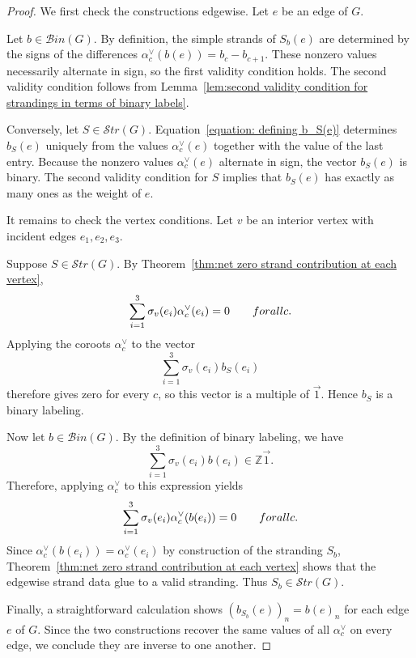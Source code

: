\documentclass[10pt,a4paper]{amsart}
\begin{document}
\begin{proof}
We first check the constructions edgewise. Let $e$ be an edge of $G$.

Let $b\in\mathcal{B}in(G)$. By definition, the simple strands of $S_b(e)$ are determined by the signs of the differences $\alpha_c^\vee(b(e))=b_c-b_{c+1}$. These nonzero values necessarily alternate in sign, so the first validity condition holds. The second validity condition follows from Lemma~\ref{lem:second validity condition for strandings in terms of binary labels}.

Conversely, let $S\in\mathcal{S}tr(G)$. Equation~\eqref{equation: defining b_S(e)} determines $b_S(e)$ uniquely from the values $\alpha_c^\vee(e)$ together with the value of the last entry. Because the nonzero values $\alpha_c^\vee(e)$ alternate in sign, the vector $b_S(e)$ is binary. The second validity condition for $S$ implies that $b_S(e)$ has exactly as many ones as the weight of $e$.


It remains to check the vertex conditions. Let $v$ be an interior vertex with incident edges $e_1,e_2,e_3$. 

Suppose $S\in\mathcal{S}tr(G)$. By Theorem~\ref{thm:net zero strand contribution at each vertex},
$$
\sum_{i=1}^3 \sigma_v(e_i)\alpha_c^\vee(e_i)=0
\qquad\textup{for all } c.
$$
Applying the coroots $\alpha_c^\vee$ to the vector
$$
\sum_{i=1}^3 \sigma_v(e_i)b_S(e_i)
$$
therefore gives zero for every $c$, so this vector is a multiple of $\vec{1}$. Hence $b_S$ is a binary labeling.

Now let $b\in\mathcal{B}in(G)$.  By the definition of binary labeling, we have
$$
\sum_{i=1}^3 \sigma_v(e_i)b(e_i)\in \mathbb{Z}\vec{1}.
$$
 Therefore, applying $\alpha_c^\vee$ to this expression yields
$$
\sum_{i=1}^3 \sigma_v(e_i)\alpha_c^\vee(b(e_i))=0
\qquad\textup{for all } c.
$$
Since $\alpha_c^\vee(b(e_i))=\alpha_c^\vee(e_i)$ by construction of the stranding $S_b$, Theorem~\ref{thm:net zero strand contribution at each vertex} shows that the edgewise strand data glue to a valid stranding. Thus $S_b\in\mathcal{S}tr(G)$.

Finally, a straightforward calculation shows $(b_{S_b}(e))_n=b(e)_n$ for each edge $e$ of $G$. Since the two constructions recover the same values of all $\alpha_c^\vee$ on every edge, we conclude they are inverse to one another.
\end{proof}
\end{document}

